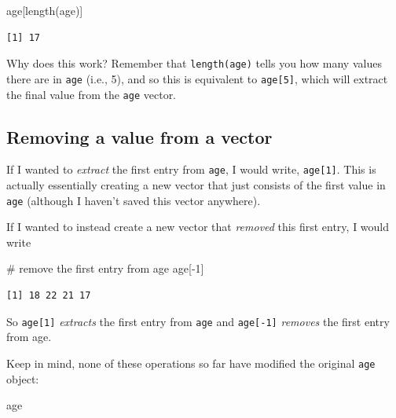 \documentclass[
  letterpaper,
  DIV=11,
  numbers=noendperiod]{scrreprt}
\newenvironment{Shaded}{\begin{snugshade}}{\end{snugshade}}
\newcommand{\CommentTok}[1]{\textcolor[rgb]{0.37,0.37,0.37}{#1}}
\newcommand{\DecValTok}[1]{\textcolor[rgb]{0.68,0.00,0.00}{#1}}
\newcommand{\FunctionTok}[1]{\textcolor[rgb]{0.28,0.35,0.67}{#1}}
\newcommand{\NormalTok}[1]{\textcolor[rgb]{0.00,0.23,0.31}{#1}}
\newcommand{\SpecialCharTok}[1]{\textcolor[rgb]{0.37,0.37,0.37}{#1}}
\begin{document}
\begin{Shaded}
\begin{Highlighting}[]
\NormalTok{age[}\FunctionTok{length}\NormalTok{(age)]}
\end{Highlighting}
\end{Shaded}

\begin{verbatim}
[1] 17
\end{verbatim}

Why does this work? Remember that \texttt{length(age)} tells you how
many values there are in \texttt{age} (i.e., 5), and so this is
equivalent to \texttt{age{[}5{]}}, which will extract the final value
from the \texttt{age} vector.

\subsection{Removing a value from a
vector}\label{removing-a-value-from-a-vector}

If I wanted to \emph{extract} the first entry from \texttt{age}, I would
write, \texttt{age{[}1{]}}. This is actually essentially creating a new
vector that just consists of the first value in \texttt{age} (although I
haven't saved this vector anywhere).

If I wanted to instead create a new vector that \emph{removed} this
first entry, I would write

\begin{Shaded}
\begin{Highlighting}[]
\CommentTok{\# remove the first entry from age}
\NormalTok{age[}\SpecialCharTok{{-}}\DecValTok{1}\NormalTok{]}
\end{Highlighting}
\end{Shaded}

\begin{verbatim}
[1] 18 22 21 17
\end{verbatim}

So \texttt{age{[}1{]}} \emph{extracts} the first entry from \texttt{age}
and \texttt{age{[}-1{]}} \emph{removes} the first entry from age.

Keep in mind, none of these operations so far have modified the original
\texttt{age} object:

\begin{Shaded}
\begin{Highlighting}[]
\NormalTok{age}
\end{Highlighting}
\end{Shaded}
\end{document}
